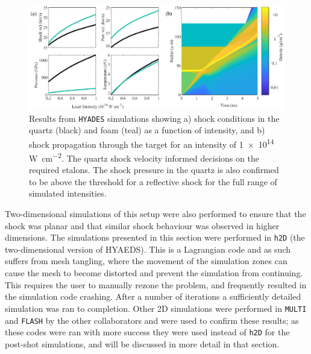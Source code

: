 \begin{figure}[hbt!]
\centering
\includegraphics[width=1\textwidth]{figures/Experiment/PreExperimentHydro.eps}%
\caption{\label{fig:PreExpHydro} Results from \texttt{HYADES} simulations showing a) shock conditions in the quartz (black) and foam (teal) as a function of intensity, and b) shock propagation through the target for an intensity of \num{1e14} \unit{\W\per\centi\meter\squared}. The quartz shock velocity informed decisions on the required etalons. The shock pressure in the quartz is also confirmed to be above the threshold for a reflective shock for the full range of simulated intensities.}
\end{figure}

Two-dimensional simulations of this setup were also performed to ensure that the shock was planar and that similar shock behaviour was observed in higher dimensions. The simulations presented in this section were performed in \texttt{h2D} (the two-dimensional version of HYAEDS). This is a Lagrangian code and as such suffers from mesh tangling, where the movement of the simulation zones can cause the mesh to become distorted and prevent the simulation from continuing. This requires the user to manually rezone the problem, and frequently resulted in the simulation code crashing. After a number of iterations a sufficiently detailed simulation was ran to completion. Other 2D simulations were performed in \texttt{MULTI} and \texttt{FLASH} by the other collaborators and were used to confirm these results; as these codes were ran with more success they were used instead of \texttt{h2D} for the post-shot simulations, and will be discussed in more detail in that section.

